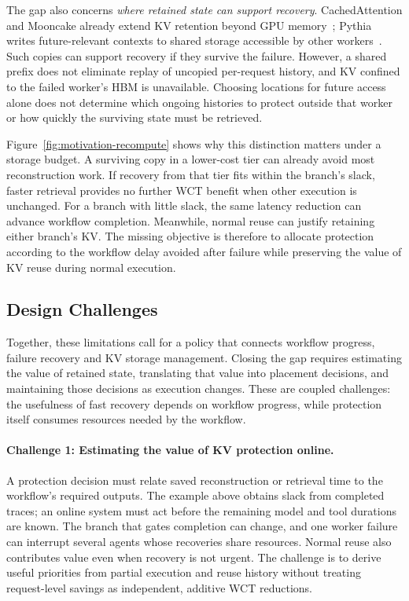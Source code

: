 The gap also concerns \emph{where retained state can support recovery}.
CachedAttention and Mooncake already extend KV retention beyond GPU
memory~\cite{gao2024cachedattention,qin2025mooncake}; Pythia writes
future-relevant contexts to shared storage accessible by other
workers~\cite{yu2026pythia}. Such copies can support recovery if they survive
the failure. However, a shared prefix does not eliminate replay of
uncopied per-request history, and KV confined to the failed worker's HBM is
unavailable. Choosing locations for future access alone does not determine
which ongoing histories to protect outside that worker or how quickly
the surviving state must be retrieved.

\label{sec:motivation-long-context}
Figure~\ref{fig:motivation-recompute} shows why this distinction matters
under a storage budget. A surviving copy in a lower-cost tier can already
avoid most reconstruction work. If recovery from that tier fits within
the branch's slack, faster retrieval provides no further WCT benefit
when other execution is unchanged. For a branch with little slack,
the same latency reduction can advance workflow completion.
Meanwhile, normal reuse can justify retaining either branch's KV.
The missing objective is therefore to allocate protection according to
the workflow delay avoided after failure while preserving the value of
KV reuse during normal execution.

\subsection{Design Challenges}
\label{sec:motivation-challenges}

Together, these limitations call for a policy that connects workflow
progress, failure recovery and KV storage management. Closing the gap
requires estimating the value of retained state, translating that value
into placement decisions, and maintaining those decisions as execution
changes. These are coupled challenges: the usefulness of fast recovery
depends on workflow progress, while protection itself consumes resources
needed by the workflow.

\paragraph{Challenge 1: Estimating the value of KV protection online.}
A protection decision must relate saved reconstruction or retrieval time
to the workflow's required outputs. The example above obtains slack from
completed traces; an online system must act before the remaining model
and tool durations are known. The branch that gates completion can
change, and one worker failure can interrupt several agents whose
recoveries share resources. Normal reuse also contributes value even
when recovery is not urgent. The challenge is to derive useful priorities
from partial execution and reuse history without treating request-level
savings as independent, additive WCT reductions.

